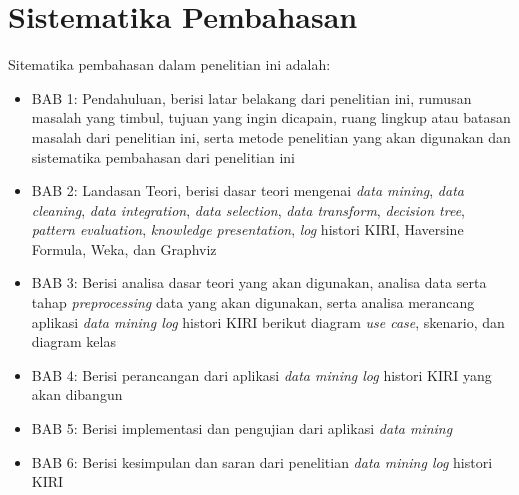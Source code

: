 \section{Sistematika Pembahasan}
Sitematika pembahasan dalam penelitian ini adalah:
\begin{itemize}
	\item BAB 1: Pendahuluan, berisi latar belakang dari penelitian ini, rumusan masalah yang timbul, tujuan yang ingin dicapain, ruang lingkup atau batasan masalah dari penelitian ini, serta metode penelitian yang akan digunakan dan sistematika pembahasan dari penelitian ini
	\item BAB 2: Landasan Teori, berisi dasar teori mengenai \textsl{data mining}, \textsl{data cleaning}, \textsl{data integration}, \textsl{data selection}, \textsl{data transform}, \textsl{decision tree}, \textsl{pattern evaluation}, \textsl{knowledge presentation}, \textsl{log} histori KIRI, Haversine Formula, Weka, dan Graphviz
	\item BAB 3: Berisi analisa dasar teori yang akan digunakan, analisa data serta tahap \textsl{preprocessing} data yang akan digunakan, serta analisa merancang aplikasi \textsl{data mining log} histori KIRI berikut diagram \textsl{use case}, skenario, dan diagram kelas
	\item BAB 4: Berisi perancangan dari aplikasi \textsl{data mining log} histori KIRI yang akan dibangun
	\item BAB 5: Berisi implementasi dan pengujian dari aplikasi \textsl{data mining}  
	\item BAB 6: Berisi kesimpulan dan saran dari penelitian \textsl{data mining log} histori KIRI
\end{itemize}